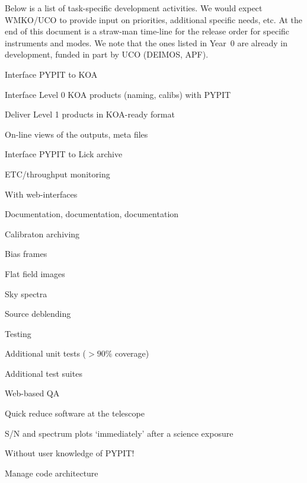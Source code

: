\documentclass[11pt,preprint]{aastex}
\newenvironment{my_enumerate}{
\begin{enumerate}
  \setlength{\itemsep}{1pt}
  \setlength{\parskip}{0pt}
  \setlength{\parsep}{0pt}}{\end{enumerate}
}
\begin{document}
Below is a list of task-specific development activities.
We would expect WMKO/UCO to provide input on priorities,
additional specific needs, etc.  At the end of this
document is a straw-man time-line for the release
order for specific instruments and modes.  We note
that the ones listed in Year~0 are already in development,
funded in part by UCO (DEIMOS, APF).  


\begin{my_enumerate}
\item Interface PYPIT to KOA
  \begin{my_enumerate}
  \item Interface Level 0 KOA products (naming, calibs) with PYPIT
  \item Deliver Level 1 products in KOA-ready format
  \item On-line views of the outputs, meta files
  \end{my_enumerate}
\item Interface PYPIT to Lick archive
\item ETC/throughput monitoring
  \begin{my_enumerate}
  \item With web-interfaces
  \end{my_enumerate}
\item Documentation, documentation, documentation
\item Calibraton archiving
  \begin{my_enumerate}
  \item Bias frames
  \item Flat field images
  \item Sky spectra
  \end{my_enumerate}
\item Source deblending
\item Testing 
  \begin{my_enumerate}
  \item Additional unit tests ($>90\%$ coverage)
  \item Additional test suites
  \end{my_enumerate}
\item Web-based QA
\item Quick reduce software at the telescope
  \begin{my_enumerate}
  \item S/N and spectrum plots `immediately' after a science exposure
  \item Without user knowledge of PYPIT!
  \end{my_enumerate}
\item Manage code architecture
\end{my_enumerate}
\end{document}
